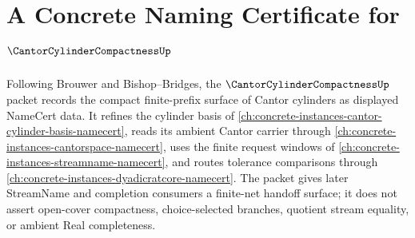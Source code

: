 \chapter{A Concrete Naming Certificate for $\CantorCylinderCompactnessUp$}
\label{ch:concrete-instances-cantor-cylinder-compactness-namecert}

Following Brouwer and Bishop--Bridges, the $\CantorCylinderCompactnessUp$ packet records the compact finite-prefix surface of Cantor cylinders as displayed NameCert data. It refines the cylinder basis of \autoref{ch:concrete-instances-cantor-cylinder-basis-namecert}, reads its ambient Cantor carrier through \autoref{ch:concrete-instances-cantorspace-namecert}, uses the finite request windows of \autoref{ch:concrete-instances-streamname-namecert}, and routes tolerance comparisons through \autoref{ch:concrete-instances-dyadicratcore-namecert}. The packet gives later StreamName and completion consumers a finite-net handoff surface; it does not assert open-cover compactness, choice-selected branches, quotient stream equality, or ambient Real completeness.

